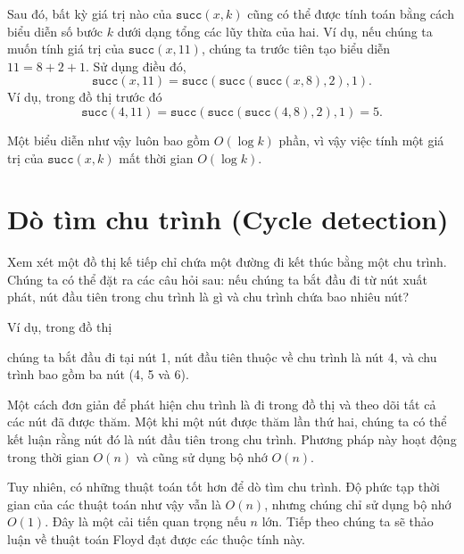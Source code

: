 Sau đó, bất kỳ giá trị nào của $\texttt{succ}(x,k)$ cũng có thể được tính toán
bằng cách biểu diễn số bước $k$ dưới dạng tổng các lũy thừa của hai.
Ví dụ, nếu chúng ta muốn tính giá trị của $\texttt{succ}(x,11)$,
chúng ta trước tiên tạo biểu diễn $11=8+2+1$.
Sử dụng điều đó,
\[\texttt{succ}(x,11)=\texttt{succ}(\texttt{succ}(\texttt{succ}(x,8),2),1).\]
Ví dụ, trong đồ thị trước đó
\[\texttt{succ}(4,11)=\texttt{succ}(\texttt{succ}(\texttt{succ}(4,8),2),1)=5.\]

Một biểu diễn như vậy luôn bao gồm
$O(\log k)$ phần, vì vậy việc tính một giá trị của $\texttt{succ}(x,k)$
mất thời gian $O(\log k)$.

\section{Dò tìm chu trình (Cycle detection)}


Xem xét một đồ thị kế tiếp chỉ chứa
một đường đi kết thúc bằng một chu trình.
Chúng ta có thể đặt ra các câu hỏi sau:
nếu chúng ta bắt đầu đi từ nút xuất phát,
nút đầu tiên trong chu trình là gì
và chu trình chứa bao nhiêu nút?

Ví dụ, trong đồ thị

\begin{center}
\end{center}
chúng ta bắt đầu đi tại nút 1,
nút đầu tiên thuộc về chu trình là nút 4, và chu trình bao gồm
ba nút (4, 5 và 6).

Một cách đơn giản để phát hiện chu trình là đi trong
đồ thị và theo dõi
tất cả các nút đã được thăm. Một khi một nút được thăm
lần thứ hai, chúng ta có thể kết luận
rằng nút đó là nút đầu tiên trong chu trình.
Phương pháp này hoạt động trong thời gian $O(n)$ và cũng sử dụng
bộ nhớ $O(n)$.

Tuy nhiên, có những thuật toán tốt hơn để dò tìm chu trình.
Độ phức tạp thời gian của các thuật toán như vậy vẫn là $O(n)$,
nhưng chúng chỉ sử dụng bộ nhớ $O(1)$.
Đây là một cải tiến quan trọng nếu $n$ lớn.
Tiếp theo chúng ta sẽ thảo luận về thuật toán Floyd
đạt được các thuộc tính này.

